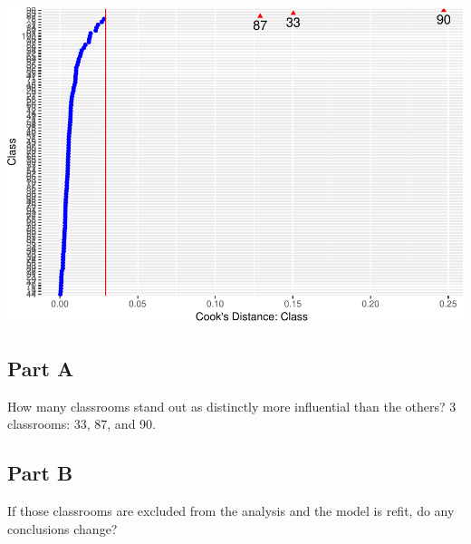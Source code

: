 \documentclass[]{article}
\begin{document}
\includegraphics{Beck_HW_5_R_2_files/figure-latex/unnamed-chunk-25-1.pdf}

\subsection{Part A}\label{part-a-5}

How many classrooms stand out as distinctly more influential than the
others? 3 classrooms: 33, 87, and 90.

\subsection{Part B}\label{part-b-5}

If those classrooms are excluded from the analysis and the model is
refit, do any conclusions change?
\end{document}
